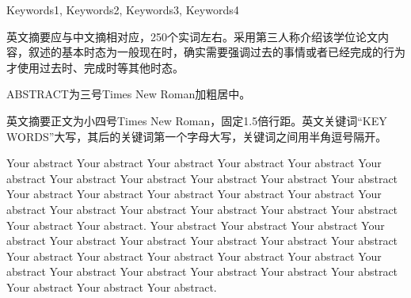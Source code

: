 \documentclass[bachelor,nocolorlinks, printoneside]{seuthesis} %
\begin{document}
\pagestyle{seuabstractstyle}
\begin{abstract}{关键词1，关键词2，关键词3，关键词4}

摘要内容独立于正文而存在，是论文内容高度概括的简要陈述，应准确、具体、完整地概括论文的主要信息，内容包括研究目的、方法、过程、成果、结论及主要创新之处等，不含图表，不加注释，具有独立性和完整性，一般为400字左右。

“摘要”用三号黑体加粗居中，“摘”与“要”之间空4个半角空格。摘要正文内容用小四号宋体，固定1.5倍行距。

论文的关键词是反映毕业设计（论文）主题内容的名词，一般为3-5个，排在摘要正文部分下方。关键词与摘要之间空一行。关键词之间用逗号分开，最后一个关键词后不加标点符号。
\end{abstract}

\begin{englishabstract}{ Keywords1, Keywords2, Keywords3, Keywords4}

英文摘要应与中文摘相对应，250个实词左右。采用第三人称介绍该学位论文内容，叙述的基本时态为一般现在时，确实需要强调过去的事情或者已经完成的行为才使用过去时、完成时等其他时态。

ABSTRACT为三号Times New Roman加粗居中。

英文摘要正文为小四号Times New Roman，固定1.5倍行距。英文关键词“KEY WORDS”大写，其后的关键词第一个字母大写，关键词之间用半角逗号隔开。

Your abstract Your abstract Your abstract Your abstract Your abstract Your abstract Your abstract Your abstract Your abstract Your abstract Your abstract Your abstract Your abstract Your abstract Your abstract Your abstract Your abstract Your abstract Your abstract Your abstract Your abstract Your abstract Your abstract Your abstract. Your abstract Your abstract Your abstract Your abstract Your abstract Your abstract Your abstract Your abstract Your abstract Your abstract Your abstract Your abstract Your abstract Your abstract Your abstract Your abstract Your abstract Your abstract Your abstract Your abstract Your abstract Your abstract Your abstract.
\end{englishabstract}

\tableofcontents
\end{document}
